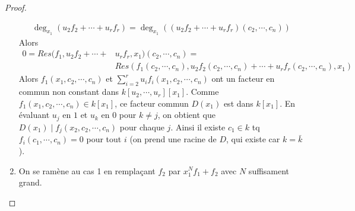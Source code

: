 \begin{proof}
\begin{enumerate}
                    \begin{align*}
                        \deg_{x_1}(u_2f_2 + \cdots + u_rf_r) = \deg_{x_1}((u_2f_2 + \cdots + u_rf_r)(c_2, \cdots, c_n))
                    \end{align*}
                    Alors 
                    \begin{align*}
                        0 = Res(f_1, u_2f_2 + \cdots + &u_rf_r, x_1)(c_2, \cdots, c_n) = \\
                        &Res(f_1(c_2, \cdots, c_n), u_2f_2(c_2, \cdots, c_n) + \cdots + u_rf_r(c_2, \cdots, c_n), x_1)
                    \end{align*}
                    Alors $f_1(x_1, c_2, \cdots, c_n)$ et $\sum_{i = 2}^r u_if_i(x_1, c_2, \cdots, c_n)$ ont un facteur en commun non constant dans $k[u_2, \cdots, u_r][x_1]$. Comme $f_1(x_1, c_2, \cdots, c_n) \in k[x_1]$, ce facteur commun $D(x_1)$ est dans $k[x_1]$. En évaluant $u_j$ en $1$ et $u_k$ en $0$ pour $k \neq j$, on obtient que $D(x_1) \mid f_j(x_2, c_2, \cdots, c_n)$ pour chaque $j$. Ainsi il existe $c_1 \in k$ tq $f_i(c_1, \cdots, c_n) = 0$ pour tout $i$ (on prend une racine de $D$, qui existe car $k = \bar k$).
                    \item On se ramène au cas 1 en remplaçant $f_2$ par $x_1^Nf_1 + f_2$ avec $N$ suffisament grand.
                \end{enumerate}
            \end{proof}

